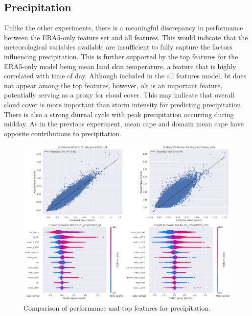 \clearpage
\subsection{Precipitation}

Unlike the other experiments, there is a meaningful discrepancy in performance between the ERA5-only feature set and all features. This would indicate that the meteorological variables available are insufficient to fully capture the factors influencing precipitation. This is further supported by the top features for the ERA5-only model being mean land skin temperature, a feature that is highly correlated with time of day. Although included in the all features model, \acrfull{bt} does not appear among the top features, however, \acrfull{olr} is an important feature, potentially serving as a proxy for cloud cover. This may indicate that overall cloud cover is more important than storm intensity for predicting precipitation. There is also a strong diurnal cycle with peak precipitation occurring during midday. As in the previous experiment, mean \acrshort{cape} and domain mean \acrshort{cape} have opposite contributions to precipitation.

\begin{figure}[ht]
    \centering
    \includegraphics[width=\textwidth]{../figures/generated/experiments/obs_precipitation/obs_precipitation_summary.png}
    \caption{Comparison of performance and top features for precipitation.}
    \label{fig:obs_precipitation_summary}
\end{figure}

